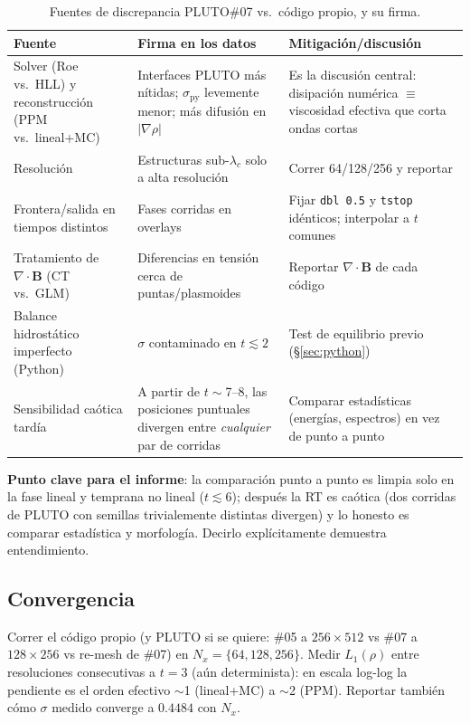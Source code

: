 \documentclass[11pt,a4paper]{article}
\newcommand{\B}{\mathbf{B}}
\newcommand{\code}[1]{\texttt{#1}}
\begin{document}
\begin{table}[htbp]
\centering\small
\caption{Fuentes de discrepancia PLUTO\#07 vs.\ código propio, y su firma.}
\begin{tabular}{@{}p{4.6cm}p{4.4cm}p{6.6cm}@{}}
\toprule
Fuente & Firma en los datos & Mitigación/discusión \\
\midrule
Solver (Roe vs.\ HLL) y reconstrucción (PPM vs.\ lineal+MC) & Interfaces PLUTO más nítidas; $\sigma_\mathrm{py}$ levemente menor; más difusión en $|\nabla\rho|$ & Es la discusión central: disipación numérica $\equiv$ viscosidad efectiva que corta ondas cortas \\
Resolución & Estructuras sub-$\lambda_c$ solo a alta resolución & Correr 64/128/256 y reportar \\
Frontera/salida en tiempos distintos & Fases corridas en overlays & Fijar \code{dbl 0.5} y \code{tstop} idénticos; interpolar a $t$ comunes \\
Tratamiento de $\nabla\cdot\B$ (CT vs.\ GLM) & Diferencias en tensión cerca de puntas/plasmoides & Reportar $\nabla\cdot\B$ de cada código \\
Balance hidrostático imperfecto (Python) & $\sigma$ contaminado en $t\lesssim2$ & Test de equilibrio previo (\S\ref{sec:python}) \\
Sensibilidad caótica tardía & A partir de $t\sim$7--8, las posiciones puntuales divergen entre \emph{cualquier} par de corridas & Comparar estadísticas (energías, espectros) en vez de punto a punto \\
\bottomrule
\end{tabular}
\end{table}

\textbf{Punto clave para el informe}: la comparación punto a punto es limpia solo en la fase
lineal y temprana no lineal ($t\lesssim6$); después la RT es caótica (dos corridas de PLUTO
con semillas trivialemente distintas divergen) y lo honesto es comparar estadística y
morfología. Decirlo explícitamente demuestra entendimiento.

\subsection{Convergencia}

Correr el código propio (y PLUTO si se quiere: \#05 a $256\times512$ vs \#07 a $128\times256$
vs re-mesh de \#07) en $N_x=\{64,128,256\}$. Medir $L_1(\rho)$ entre resoluciones
consecutivas a $t=3$ (aún determinista): en escala log-log la pendiente es el orden efectivo
$\sim$1 (lineal+MC) a $\sim$2 (PPM). Reportar también cómo $\sigma$ medido converge a
$0.4484$ con $N_x$.
\end{document}
